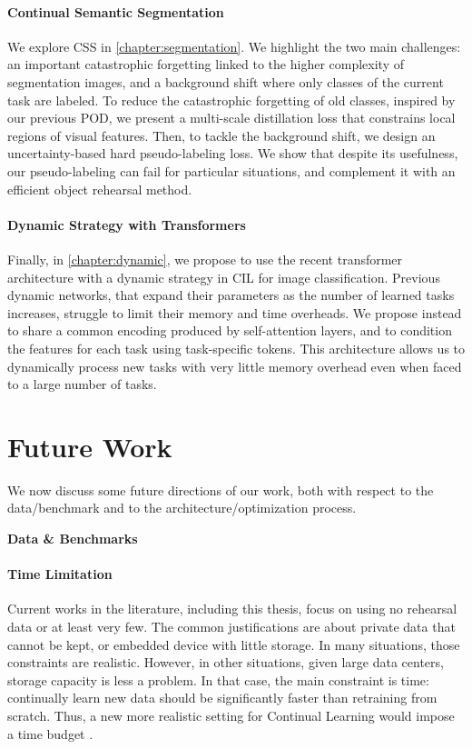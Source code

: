 \paragraph{Continual Semantic Segmentation} We explore \ac{CSS} in \autoref{chapter:segmentation}.
We highlight the two main challenges: an important catastrophic forgetting linked to the higher
complexity of segmentation images, and a background shift where only classes of the current task are
labeled. To reduce the catastrophic forgetting of old classes, inspired by our previous POD, we
present a multi-scale distillation loss that constrains local regions of visual features. Then, to
tackle the background shift, we design an uncertainty-based hard pseudo-labeling loss. We show that
despite its usefulness, our pseudo-labeling can fail for particular situations, and complement it
with an efficient object rehearsal method.

\paragraph{Dynamic Strategy with Transformers} Finally, in \autoref{chapter:dynamic}, we propose to
use the recent transformer architecture with a dynamic strategy in \acf{CIL} for image
classification. Previous dynamic networks, that expand their parameters as the number of learned
tasks increases, struggle to limit their memory and time overheads. We propose instead to share a
common encoding produced by self-attention layers, and to condition the features for each task using
task-specific tokens. This architecture allows us to dynamically process new tasks with very little
memory overhead even when faced to a large number of tasks.

\section{Future Work}

We now discuss some future directions of our work, both with respect to the data/benchmark and to
the architecture/optimization process.

\vspace{2em}
\noindent\large{\textbf{Data \& Benchmarks}}

\paragraph{Time Limitation} Current works in the literature, including this thesis, focus on using
no rehearsal data or at least very few. The common justifications are about private data that cannot
be kept, or embedded device with little storage. In many situations, those constraints are
realistic. However, in other situations, given large data centers, storage capacity is less a
problem. In that case, the main constraint is time: continually learn new data should be
significantly faster than retraining from scratch. Thus, a new more realistic setting for Continual
Learning would impose a time budget \citep{veniat2018budgetedlearning}.

